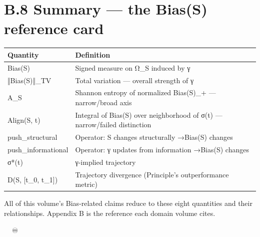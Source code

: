 \documentclass[11pt, openany]{book}
\newcommand{\sectionbreak}{\clearpage}
\begin{document}
\sectionbreak

\section{B.8 Summary --- the Bias(S) reference card}

\begingroup\setlength{\tabcolsep}{3pt}\renewcommand{\arraystretch}{1.15}\footnotesize
\begin{center}
\begin{tabular}{p{0.87in} p{3.52in}}
\toprule
Quantity & Definition \\
\midrule
Bias(S) & Signed measure on Ω\_\allowbreak{}S induced by γ \\
‖Bias(S)‖\_\allowbreak{}TV & Total variation --- overall strength of γ \\
A\_\allowbreak{}S & Shannon entropy of normalized Bias(S)\_\allowbreak{}+ --- narrow/\allowbreak broad axis \\
Align(S, t) & Integral of Bias(S) over neighborhood of σ(t) --- narrow/\allowbreak failed distinction \\
push\_\allowbreak{}structural & Operator: S changes structurally →\allowbreak  Bias(S) changes \\
push\_\allowbreak{}informational & Operator: γ updates from information →\allowbreak  Bias(S) changes \\
σ*(t) & γ-implied trajectory \\
D(S, [t\_\allowbreak{}0, t\_\allowbreak{}1]) & Trajectory divergence (Principle's outperformance metric) \\
\bottomrule
\end{tabular}
\end{center}
\endgroup
All of this volume's Bias-related claims reduce to these eight quantities and their relationships. Appendix B is the reference each domain volume cites.

\sectionbreak

🦞🧍💜🔥♾️
\end{document}
